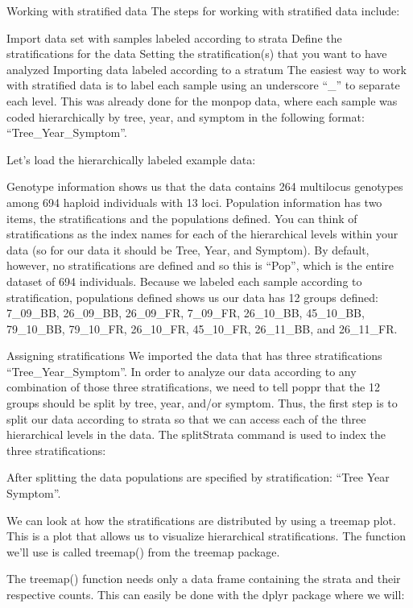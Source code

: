 \documentclass[12pt,]{krantz}
\theoremstyle{definition}
\theoremstyle{definition}
\theoremstyle{definition}
\theoremstyle{remark}
\begin{document}
Working with stratified data The steps for working with stratified data
include:

Import data set with samples labeled according to strata Define the
stratifications for the data Setting the stratification(s) that you want
to have analyzed Importing data labeled according to a stratum The
easiest way to work with stratified data is to label each sample using
an underscore ``\_'' to separate each level. This was already done for
the monpop data, where each sample was coded hierarchically by tree,
year, and symptom in the following format: ``Tree\_Year\_Symptom''.

Let's load the hierarchically labeled example data:

Genotype information shows us that the data contains 264 multilocus
genotypes among 694 haploid individuals with 13 loci. Population
information has two items, the stratifications and the populations
defined. You can think of stratifications as the index names for each of
the hierarchical levels within your data (so for our data it should be
Tree, Year, and Symptom). By default, however, no stratifications are
defined and so this is ``Pop'', which is the entire dataset of 694
individuals. Because we labeled each sample according to stratification,
populations defined shows us our data has 12 groups defined: 7\_09\_BB,
26\_09\_BB, 26\_09\_FR, 7\_09\_FR, 26\_10\_BB, 45\_10\_BB, 79\_10\_BB,
79\_10\_FR, 26\_10\_FR, 45\_10\_FR, 26\_11\_BB, and 26\_11\_FR.

Assigning stratifications We imported the data that has three
stratifications ``Tree\_Year\_Symptom''. In order to analyze our data
according to any combination of those three stratifications, we need to
tell poppr that the 12 groups should be split by tree, year, and/or
symptom. Thus, the first step is to split our data according to strata
so that we can access each of the three hierarchical levels in the data.
The splitStrata command is used to index the three stratifications:

After splitting the data populations are specified by stratification:
``Tree Year Symptom''.

We can look at how the stratifications are distributed by using a
treemap plot. This is a plot that allows us to visualize hierarchical
stratifications. The function we'll use is called treemap() from the
treemap package.

The treemap() function needs only a data frame containing the strata and
their respective counts. This can easily be done with the dplyr package
where we will:
\end{document}
